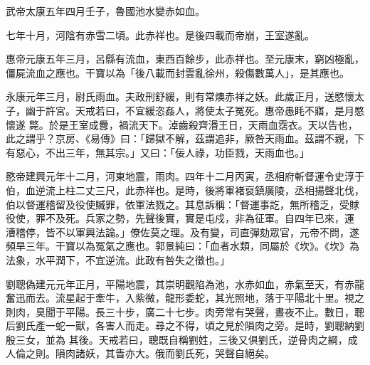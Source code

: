 \begin{pinyinscope}
 武帝太康五年四月壬子，魯國池水變赤如血。



 七年十月，河陰有赤雪二頃。此赤祥也。是後四載而帝崩，王室遂亂。



 惠帝元康五年三月，呂縣有流血，東西百餘步，此赤祥也。至元康末，窮凶極亂，僵屍流血之應也。干寶以為「後八載而封雲亂徐州，殺傷數萬人」，是其應也。



 永康元年三月，尉氏雨血。夫政刑舒緩，則有常燠赤祥之妖。此歲正月，送愍懷太子，幽于許宮。天戒若曰，不宜緩恣姦人，將使太子冤死。惠帝愚眊不寤，是月愍懷遂
 斃。於是王室成釁，禍流天下。淖齒殺齊湣王日，天雨血霑衣。天以告也，此之謂乎？京房、《易傳》曰：「歸獄不解，茲謂追非，厥咎天雨血。茲謂不親，下有惡心，不出三年，無其宗。」又曰：「佞人祿，功臣戮，天雨血也。」



 愍帝建興元年十二月，河東地震，雨肉。四年十二月丙寅，丞相府斬督運令史淳于伯，血逆流上柱二丈三尺，此赤祥也。是時，後將軍褚裒鎮廣陵，丞相揚聲北伐，伯以督運稽留及役使贓罪，依軍法戮之。其息訴稱：「督運事訖，無所稽乏，受賕役使，罪不及死。兵家之勢，先聲後實，實是屯戍，非為征軍。自四年已來，運
 漕稽停，皆不以軍興法論。」僚佐莫之理。及有變，司直彈劾眾官，元帝不問，遂頻旱三年。干寶以為冤氣之應也。郭景純曰：「血者水類，同屬於《坎》。《坎》為法象，水平潤下，不宜逆流。此政有咎失之徵也。」



 劉聰偽建元元年正月，平陽地震，其崇明觀陷為池，水赤如血，赤氣至天，有赤龍奮迅而去。流星起于牽牛，入紫微，龍形委蛇，其光照地，落于平陽北十里。視之則肉，臭聞于平陽。長三十步，廣二十七步。肉旁常有哭聲，晝夜不止。數日，聰后劉氏產一蛇一獸，各害人而走。尋之不得，頃之見於隕肉之旁。是時，劉聰納劉殷三女，並為
 其後。天戒若曰，聰既自稱劉姓，三後又俱劉氏，逆骨肉之綱，成人倫之則。隕肉諸妖，其眚亦大。俄而劉氏死，哭聲自絕矣。



\end{pinyinscope}